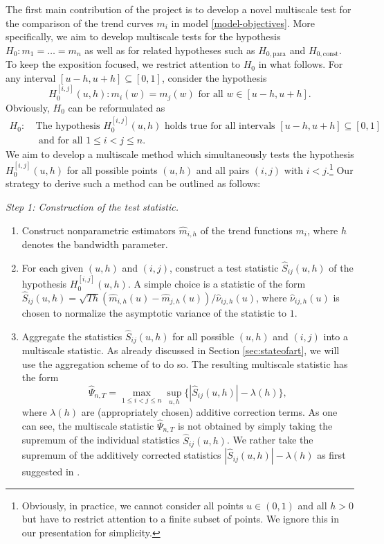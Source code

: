 \documentclass[a4paper,12pt]{article}
\begin{document}
\noindent The first main contribution of the project is to develop a novel multiscale test for the comparison of the trend curves $m_i$ in model \eqref{model-objectives}. More specifically, we aim to develop multiscale tests for the hypothesis $H_0: m_1 = \ldots = m_n$ as well as for related hypotheses such as $H_{0,\text{para}}$ and $H_{0,\text{const}}$. To keep the exposition focused, we restrict attention to $H_0$ in what follows. For any interval $[u-h,u+h] \subseteq [0,1]$, consider the hypothesis
\[ H_0^{[i,j]}(u,h): m_i(w) = m_j(w) \text{ for all } w \in [u-h,u+h]. \] 
Obviously, $H_0$ can be reformulated as
\begin{align*}
H_0: \ & \text{The hypothesis } H_0^{[i,j]}(u,h) \text{ holds true for all intervals } [u-h,u+h] \subseteq [0,1] \\ & \text{ and for all } 1 \le i < j \le n. 
\end{align*} 
We aim to develop a multiscale method which simultaneously tests the hypothesis $H_0^{[i,j]}(u,h)$ for all possible points $(u,h)$ and all pairs $(i,j)$ with $i < j$.\footnote{Obviously, in practice, we cannot consider all points $u \in (0,1)$ and all $h > 0$ but have to restrict attention to a finite subset of points. We ignore this in our presentation for simplicity.} Our strategy to derive such a method can be outlined as follows:
\vspace{10pt}


\noindent \textit{Step 1: Construction of the test statistic.}
\begin{enumerate}[label=(\roman*),leftmargin=0.75cm]

\item Construct nonparametric estimators $\hat{m}_{i,h}$ of the trend functions $m_i$, where $h$ denotes the bandwidth parameter.   

\item For each given $(u,h)$ and $(i,j)$, construct a test statistic $\hat{S}_{ij}(u,h)$ of the hypothesis $H_0^{[i,j]}(u,h)$. A simple choice is a statistic of the form $\hat{S}_{ij}(u,h) = \sqrt{Th} (\hat{m}_{i,h}(u) - \hat{m}_{j,h}(u)) / \hat{\nu}_{ij,h}(u)$, where $\hat{\nu}_{ij,h}(u)$ is chosen to normalize the asymptotic variance of the statistic to $1$. 

\item Aggregate the statistics $\hat{S}_{ij}(u,h)$ for all possible $(u,h)$ and $(i,j)$ into a multiscale statistic. As already discussed in Section \ref{sec:stateofart}, we will use the aggregation scheme of \cite{DuembgenSpokoiny2001} to do so. The resulting multiscale statistic has the form 
\[ \hat{\Psi}_{n,T} = \max_{1 \le i < j \le n} \sup_{u,h} \big\{ |\hat{S}_{ij}(u,h)| - \lambda(h) \big\},  \]
where $\lambda(h)$ are (appropriately chosen) additive correction terms. As one can see, the multiscale statistic $\hat{\Psi}_{n,T}$ is not obtained by simply taking the supremum of the individual statistics $\hat{S}_{ij}(u,h)$. We rather take the supremum of the additively corrected statistics $|\hat{S}_{ij}(u,h)| - \lambda(h)$ as first suggested in \cite{DuembgenSpokoiny2001}. 

\end{enumerate}
\end{document}
